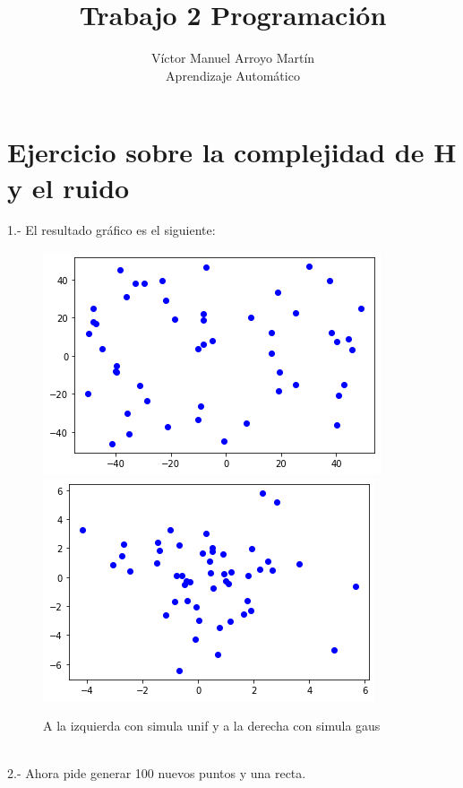 \documentclass[12pt]{article}
\date{}
\begin{document}
 
 
\title{Trabajo 2 Programación}
\author{Víctor Manuel Arroyo Martín\\ %
Aprendizaje Automático}

\maketitle
\section{Ejercicio sobre la complejidad de H y el ruido}
1.- El resultado gráfico es el siguiente:
\begin{figure}[h]
\centering
\includegraphics[scale=0.45]{Images/Ej1a.png} 
\includegraphics[scale=0.45]{Images/Ej1b.png} 
\caption{A la izquierda con simula unif y a la derecha con simula gaus}
\label{etiqueta}
\end{figure}
\\
2.- Ahora pide generar 100 nuevos puntos y una recta. \\\\
\end{document}
